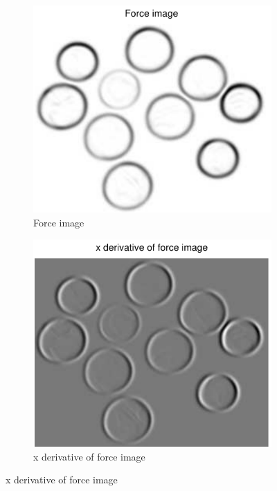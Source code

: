\documentclass[11pt,a4paper]{article}
\begin{document}
\begin{figure}[H]
\begin{subfigure}[t]{0.24\textwidth}
        \includegraphics[width=\textwidth]{src/images/coins_gradient_forces.pdf}
        \caption{Force image}
        \label{fig:coins_forces}
    \end{subfigure}
    \begin{subfigure}[t]{0.24\textwidth}
        \includegraphics[width=\textwidth]{src/images/coins_gradient_xforces.pdf}
        \caption{x derivative of force image}
        \label{fig:coins_fx}
    \end{subfigure}

\end{figure}
\end{document}

